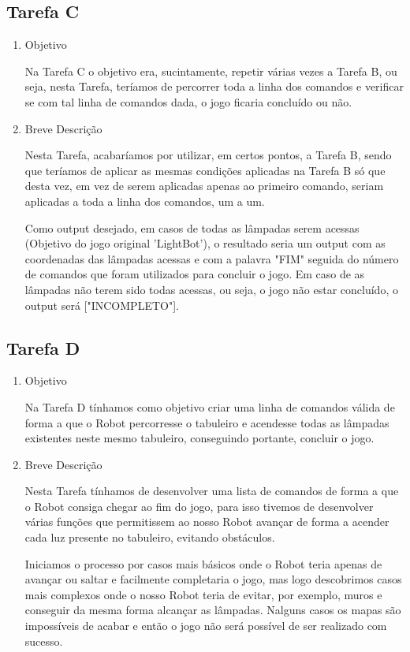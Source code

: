 \documentclass[a4paper, 12pt, portuguese]{article}
\begin{document}
\subsection{Tarefa C}
\begin{enumerate}
\item{Objetivo}

Na Tarefa C o objetivo era, sucintamente, repetir várias vezes a Tarefa B, ou seja, nesta Tarefa, teríamos de percorrer toda a linha dos comandos e verificar se com tal linha de comandos dada, o jogo ficaria concluído ou não.

\item{Breve Descrição}

Nesta Tarefa, acabaríamos por utilizar, em certos pontos, a Tarefa B, sendo que teríamos de aplicar as mesmas condições aplicadas na Tarefa B só que desta vez, em vez de serem aplicadas apenas ao primeiro comando, seriam aplicadas a toda a linha dos comandos, um a um.

Como output desejado, em casos de todas as lâmpadas serem acessas (Objetivo do jogo original 'LightBot'), o resultado seria um output com as coordenadas das lâmpadas acessas e com a palavra "FIM" seguida do número de comandos que foram utilizados para concluir o jogo. Em caso de as lâmpadas não terem sido todas acessas, ou seja, o jogo não estar concluído, o output será ["INCOMPLETO"].

\end{enumerate}

\subsection{Tarefa D}
\begin{enumerate}
\item{Objetivo}

Na Tarefa D tínhamos como objetivo criar uma linha de comandos válida de forma a que o Robot percorresse o tabuleiro e acendesse todas as lâmpadas existentes neste mesmo tabuleiro, conseguindo portante, concluir o jogo.

\item{Breve Descrição}

Nesta Tarefa tínhamos de desenvolver uma lista de comandos de forma a que o Robot consiga chegar ao fim do jogo, para isso tivemos de desenvolver várias funções que permitissem ao nosso Robot avançar de forma a acender cada luz presente no tabuleiro, evitando obstáculos.

Iniciamos o processo por casos mais básicos onde o Robot teria apenas de avançar ou saltar e facilmente completaria o jogo, mas logo descobrimos casos mais complexos onde o nosso Robot teria de evitar, por exemplo, muros e conseguir da mesma forma alcançar as lâmpadas. Nalguns casos os mapas são impossíveis de acabar e então o jogo não será possível de ser realizado com sucesso.

\end{enumerate}
\end{document}
